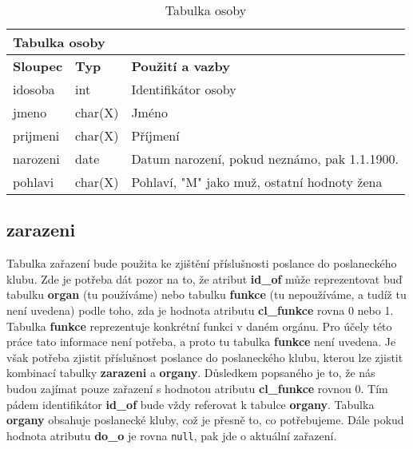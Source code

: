 \begin{center}
	\begin{longtable}{|l|l|p{9cm}|}
		\caption{Tabulka osoby
		} \label{table:osoby} \\
		
		\hline 
		
		\multicolumn{3}{|l|}{\textbf{Tabulka osoby
		}} \\
		
		\hline 
		
		\multicolumn{1}{|l|}{\textbf{Sloupec}} & \multicolumn{1}{l|}{\textbf{Typ}} & \multicolumn{1}{l|}{\textbf{Použití a vazby}} \\ 
		
		\endhead
		
		\hline 
		
		id\textunderscore osoba & int & Identifikátor osoby \\
		
		\hline 
		
		jmeno & char(X) & Jméno \\
		
		\hline 
		
		prijmeni & char(X) & Příjmení \\
		
		\hline 
		
		narozeni & date & Datum narození, pokud neznámo, pak 1.1.1900. \\
		
		\hline 
		
		pohlavi & char(X) & Pohlaví, "M" jako muž, ostatní hodnoty žena \\
		
		\hline 
		
		
	\end{longtable}
\end{center}

\subsection*{zarazeni}

Tabulka zařazení bude použita ke zjištění příslušnosti poslance do poslaneckého klubu. Zde je potřeba dát pozor na to, že atribut \textbf{id\_of} může reprezentovat buď tabulku \textbf{organ} (tu používáme) nebo tabulku \textbf{funkce} (tu nepoužíváme, a tudíž tu není uvedena) podle toho, zda je hodnota atributu \textbf{cl\_funkce} rovna 0 nebo 1. Tabulka \textbf{funkce} reprezentuje konkrétní funkci v daném orgánu. Pro účely této práce tato informace není potřeba, a proto tu tabulka \textbf{funkce} není uvedena. Je však potřeba zjistit příslušnost poslance do poslaneckého klubu, kterou lze zjistit kombinací tabulky \textbf{zarazeni} a \textbf{organy}. Důsledkem popsaného je to, že nás budou zajímat pouze zařazení s hodnotou atributu \textbf{cl\_funkce} rovnou 0. Tím pádem identifikátor \textbf{id\_of} bude vždy referovat k tabulce \textbf{organy}. Tabulka \textbf{organy} obsahuje poslanecké kluby, což je přesně to, co potřebujeme. Dále pokud hodnota atributu \textbf{do\_o} je rovna \lstinline|null|, pak jde o aktuální zařazení.

